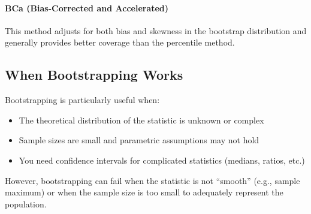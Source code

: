 \paragraph{BCa (Bias-Corrected and Accelerated)} This method adjusts for both bias and skewness in the bootstrap distribution and generally provides better coverage than the percentile method.

\subsection{When Bootstrapping Works}
Bootstrapping is particularly useful when:
\begin{itemize}
	\item The theoretical distribution of the statistic is unknown or complex
	\item Sample sizes are small and parametric assumptions may not hold
	\item You need confidence intervals for complicated statistics (medians, ratios, etc.)
\end{itemize}

However, bootstrapping can fail when the statistic is not ``smooth'' (e.g., sample maximum) or when the sample size is too small to adequately represent the population.

